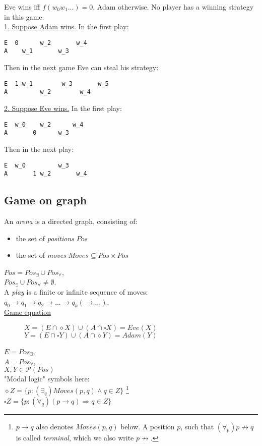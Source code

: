 \noindent
Eve wins iff $f(w_0w_1...) = 0$, Adam otherwise. No player has a winning strategy
in this game.\\
\underline{1. Suppose Adam wins.} In the first play:
\begin{verbatim}
E  0      w_2       w_4
A    w_1       w_3
\end{verbatim}
Then in the next game Eve can steal his strategy:
\begin{verbatim}
E  1 w_1        w_3       w_5
A         w_2        w_4
\end{verbatim}
\underline{2. Suppose Eve wins.} In the first play:
\begin{verbatim}
E  w_0    w_2      w_4
A       0      w_3
\end{verbatim}
Then in the next play:
\begin{verbatim}
E  w_0         w_3
A       1 w_2       w_4
\end{verbatim}

\subsection*{Game on graph}
An \textit{arena} is a directed graph, consisting of:
\begin{itemize}
	\item the set of \textit{positions} $Pos$
	\item the set of \textit{moves} $Moves \subseteq Pos \times Pos$
\end{itemize}
$Pos = Pos_{\exists} \cup Pos_{\forall}$,\\
$Pos_{\exists} \cup Pos_{\forall} \neq \emptyset$.\\
A \textit{play} is a finite or infinite sequence of moves:\\
$q_0 \rightarrow q_1 \rightarrow q_2 \rightarrow ... \rightarrow q_k (\rightarrow ...)$.\\

\noindent
\underline{Game equation}
\begin{figure}[H]
	\centering
	$X = (E \cap \diamond X) \cup (A \cap \square X) = Eve(X)$\\
	$Y = (E \cap \square Y) \cup (A \cap \diamond Y) = Adam(Y)$
\end{figure}
\noindent
$E = Pos_{\exists}$,\\
$A = Pos_{\forall}$,\\
$X, Y \in \mathcal{P}(Pos)$\\
"Modal logic" symbols here:\\
$\diamond Z = \{p : (\exists_q) Moves(p, q) \land q \in Z\}$
\footnote{
	$p \rightarrow q$ also denotes $Moves(p, q)$ below.
	A position $p$, such that $(\forall_p) p\not\rightarrow q$ is called \textit{terminal},
	which we also write $p \not\rightarrow$.
}\\
$\square Z = \{p : (\forall_q) (p \rightarrow q) \Rightarrow q \in Z\}$\\

